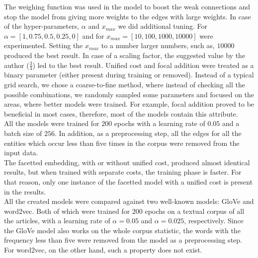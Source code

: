 The weighing function was used in the model to boost the weak connections and stop the model from giving more weights to the edges with large weights. In case of the hyper-parameters, $\alpha$ and $x_{max}$ we did additional tuning. For $\alpha=[1,0.75,0.5,0.25,0]$ and for $x_{max}=[10,100,1000,10000]$ were experimented. Setting the $x_{max}$ to a number larger numbers, such as, $10000$ produced the best result. In case of a scaling factor, the suggested value by the author ($\frac{3}{4}$) led to the best result. 
Unified cost and focal addition were treated as a binary parameter (either present during training or removed). Instead of a typical grid search, we chose a coarse-to-fine method, where instead of checking all the possible combinations, we randomly sampled some parameters and focused on the areas, where better models were trained. For example, focal addition proved to be beneficial in most cases, therefore, most of the models contain this attribute.\\

\noindent
All the models were trained for $200$ epochs with a learning rate of $0.05$ and a batch size of $256$. In addition, as a preprocessing step, all the edges for all the entities which occur less than five times in the corpus were removed from the input data. \\
The facetted embedding, with or without unified cost, produced almost identical results, but when trained with separate costs, the training phase is faster. For that reason, only one instance of the facetted model with a unified cost is present in the results. \\
\noindent
All the created models were compared against two well-known models: GloVe and word2vec. Both of which were trained for $200$ epochs on a textual corpus of all the articles, with a learning rate of $\alpha=0.05$ and $\alpha=0.025$, respectively. Since the GloVe model also works on the whole corpus statistic, the words with the frequency less than five were removed from the model as a preprocessing step. For word2vec, on the other hand, such a property does not exist. 

